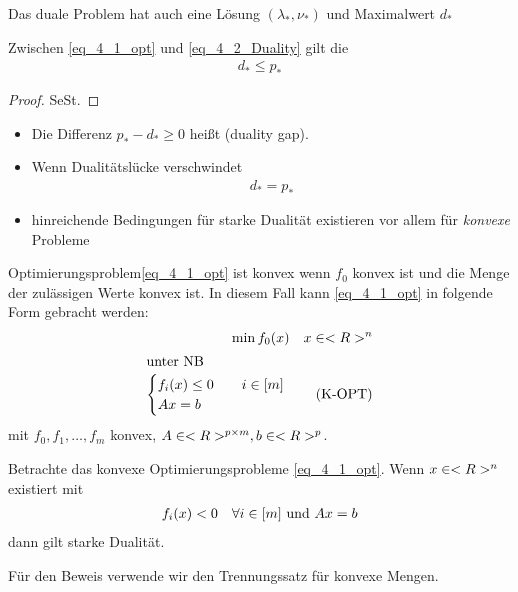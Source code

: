 Das duale Problem hat auch eine Lösung $(\lambda_{\ast}, \nu_{\ast})$ und Maximalwert $d_{\ast}$
\begin{lemma}
	Zwischen \eqref{eq_4_1_opt} und \eqref{eq_4_2_Duality} gilt die 
	\begin{align*}
		d_{\ast} \le p_{\ast}\tag{WD}\label{eq_4_3_weak_Duality}
	\end{align*}
\end{lemma}
\begin{proof}
	SeSt.
\end{proof}
\begin{*remark}
	\begin{itemize}
		\item Die Differenz $p_{\ast} - d_{\ast} \ge 0$ heißt  (duality gap).
		\item Wenn Dualitätslücke verschwindet 
		\begin{align*}
			d_{\ast} = p_{\ast}
		\end{align*}
		\item hinreichende Bedingungen für starke Dualität existieren vor allem für \emph{konvexe} Probleme
	\end{itemize}
\end{*remark}
\begin{definition}
	Optimierungsproblem\eqref{eq_4_1_opt} ist konvex wenn $f_0$ konvex ist und die Menge der zulässigen Werte konvex ist. In diesem Fall kann \eqref{eq_4_1_opt} in folgende Form gebracht werden:
	\begin{align*}
		\min f_0(x) \quad x \in <R>^n\\
		\intertext{unter NB}
		\begin{cases}
			f_i(x) \le 0 &\quad i \in [m]\\
			Ax = b &\quad
		\end{cases}\tag{K-OPT}\label{eq_4_4_k-opt}
	\end{align*}
	mit $f_0, f_1, \dots, f_m$ konvex, $A \in <R>^{p\times m}, b \in <R>^p$.
\end{definition}
\begin{theorem}
	Betrachte das konvexe Optimierungsprobleme \eqref{eq_4_1_opt}. Wenn $x \in <R>^n$ existiert mit
	\begin{align*}
		f_i(x) < 0 \quad \forall i \in [m] \text{ und } Ax = b
	\end{align*}
	dann gilt starke Dualität.
\end{theorem}
Für den Beweis verwende wir den Trennungssatz für konvexe Mengen.
